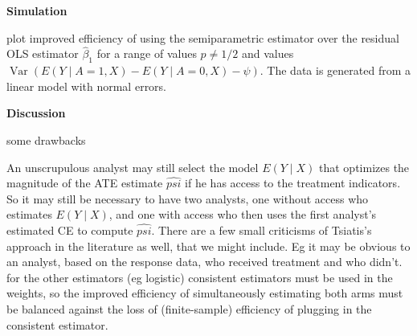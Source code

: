 \documentclass{article}
\newcommand{\EE}{E}
\newcommand{\E}[1]{\EE(Y\mid A=#1,X)}
\DeclareMathOperator{\Var}{Var}
\begin{document}
\textbf{Simulation}
\begin{outline}[enumerate]
   \1 plot improved efficiency of using the semiparametric estimator
      over the residual OLS estimator $\hat{\beta}_1$ for a range of
      values $p\neq 1/2$ and values $\Var(\E1-\E0-\psi).$ The data is
      generated from a linear model with normal errors.
    \end{outline}

\textbf{Discussion}
    \begin{outline}[enumerate]
   \1 some drawbacks

      \2 An unscrupulous analyst may still select the model $E(Y\mid
      X)$ that optimizes the magnitude of the ATE estimate $\hat{psi}$
      if he has access to the treatment indicators. So it may still be
      necessary to have two analysts, one without access who estimates
      $E(Y\mid X)$, and one with access who then uses the first analyst's estimated CE
      to compute $\hat{psi}$.
         \3 There are a few small criticisms of Tsiatis's approach in the
         literature as well, that we might include. Eg it may be
         obvious to an analyst,  based on the response data,  who
         received treatment and who didn't.
         \2 for the other estimators (eg logistic) consistent estimators
      must be used in the weights, so the improved efficiency of
      simultaneously estimating both arms must be balanced against the
      loss of (finite-sample) efficiency of plugging in the consistent
      estimator.
    \end{outline}
\end{document}
